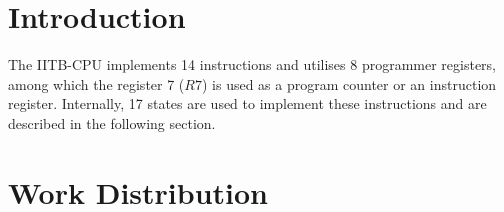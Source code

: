 \documentclass{article}
\begin{document}


\maketitle
\tableofcontents
\newpage
\section{Introduction}
The IITB-CPU implements 14 instructions and utilises 8 programmer registers, among which the register 7 ($R7$) is used as a program counter or an instruction register. Internally, 17 states are used to implement these instructions and are described in the following section.\\

\section{Work Distribution}
\end{document}
